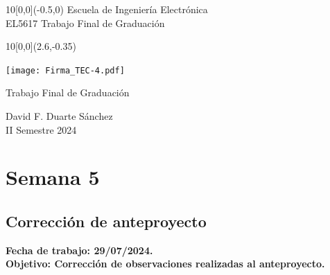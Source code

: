 \documentclass[12pt,letterpaper]{article}
\newcommand{\EstudianteA}{David F. Duarte Sánchez}
\begin{document}
	
\graphicspath{{./}{./fig/}}


%
\begin{textblock}{10}[0,0](-0.5,0)
	\large Escuela de Ingeniería Electrónica \\ 
	EL5617 Trabajo Final de Graduación \\
\end{textblock}

%
\begin{textblock}{10}[0,0](2.6,-0.35)
	\begin{flushright}
		\texttt{[image: Firma\_TEC-4.pdf]}
	\end{flushright}
\end{textblock}

\begin{center}
	\vspace{70mm}
	{\large\color{tecRojo} Trabajo Final de Graduación}
	\par\vspace{8mm}
	{\Large\bf\color{tecAzul}{Bitácora de Trabajo - Entrega 1}}
	\par\vspace{100mm}
	{{\EstudianteA \\ II Semestre 2024} 
	\vspace{8mm}}
\end{center}

\newpage

\renewcommand{\baselinestretch}{1.1}    %


\section{Semana 5}
\subsection{Corrección de anteproyecto}

\bf{Fecha de trabajo:} 29/07/2024.\\
\bf{Objetivo:} Corrección de observaciones realizadas al anteproyecto.
\end{document}
